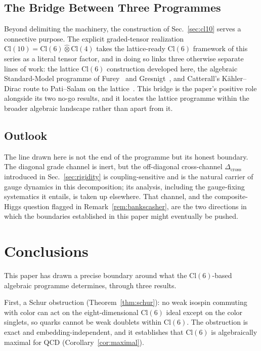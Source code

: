 \documentclass[12pt]{article}
\theoremstyle{remark}
\newcommand{\cl}{\mathrm{Cl}}
\newcommand{\grtensor}{\mathbin{\widehat{\otimes}}}  %
\begin{document}
\subsection{The Bridge Between Three Programmes}
\label{sec:bridge}

Beyond delimiting the machinery, the construction of Sec.~\ref{sec:cl10} serves a
connective purpose.  The explicit graded-tensor realization
$\cl(10)=\cl(6)\grtensor\cl(4)$ takes the lattice-ready $\cl(6)$ framework of
this series as a literal tensor factor, and in doing so links three otherwise
separate lines of work: the lattice $\cl(6)$ construction developed here, the
algebraic Standard-Model programme of Furey~\cite{Furey2018a,Furey2018b} and
Gresnigt~\cite{Gresnigt2020}, and Catterall's K\"ahler--Dirac route to
Pati--Salam on the lattice~\cite{Catterall2023,Catterall2024}.  This bridge is the paper's
positive role alongside its two no-go results, and it locates the lattice
programme within the broader algebraic landscape rather than apart from it.

\subsection{Outlook}
\label{sec:outlook}

The line drawn here is not the end of the programme but its honest boundary.  The
diagonal grade channel is inert, but the off-diagonal cross-channel
$\Delta_{\mathrm{cross}}$ introduced in Sec.~\ref{sec:rigidity} is
coupling-sensitive and is the natural carrier of gauge dynamics in this
decomposition; its analysis, including the gauge-fixing systematics it entails,
is taken up elsewhere.  That channel, and the composite-Higgs question flagged in
Remark~\ref{rem:bankscasher}, are the two directions in which the boundaries
established in this paper might eventually be pushed.

\section{Conclusions}
\label{sec:conclusions}

This paper has drawn a precise boundary around what the $\cl(6)$-based algebraic
programme determines, through three results.

First, a Schur obstruction (Theorem~\ref{thm:schur}): no weak isospin commuting
with color can act on the eight-dimensional $\cl(6)$ ideal except on the color
singlets, so quarks cannot be weak doublets within $\cl(6)$.  The obstruction is
exact and embedding-independent, and it establishes that $\cl(6)$ is
algebraically maximal for QCD (Corollary~\ref{cor:maximal}).
\end{document}

